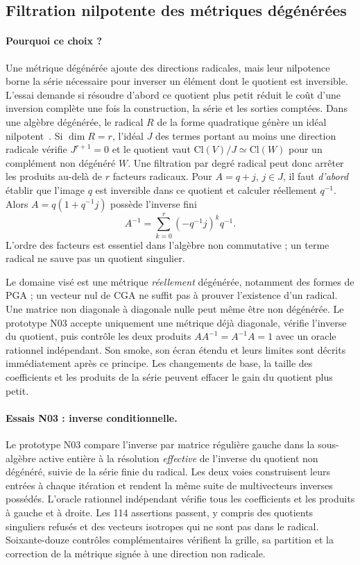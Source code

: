 \documentclass[11pt,a4paper]{article}
\newcommand{\Cl}{\mathrm{Cl}}
\begin{document}
\subsection{Filtration nilpotente des métriques dégénérées}
\paragraph{Pourquoi ce choix ?}
Une métrique dégénérée ajoute des directions radicales, mais leur
nilpotence borne la série nécessaire pour inverser un élément dont le
quotient est inversible. L'essai demande si résoudre d'abord ce
quotient plus petit réduit le coût d'une inversion complète une fois
la construction, la série et les sorties comptées.
Dans une algèbre dégénérée, le radical $R$ de la forme quadratique génère
un idéal nilpotent~\cite{ablamowicz,bamberg}. Si $\dim R=r$, l'idéal
$J$ des termes portant au moins une direction radicale vérifie
$J^{r+1}=0$ et le quotient vaut $\Cl(V)/J\simeq\Cl(W)$ pour un
complément non dégénéré $W$. Une filtration par degré radical peut
donc arrêter les produits au-delà de $r$ facteurs radicaux.
Pour $A=q+j$, $j\in J$, il faut \emph{d'abord} établir que l'image
$q$ est inversible dans ce quotient et calculer réellement $q^{-1}$.
Alors $A=q(1+q^{-1}j)$ possède l'inverse fini
\[
 A^{-1}=\sum_{k=0}^{r}(-q^{-1}j)^k q^{-1}.
\]
L'ordre des facteurs est essentiel dans l'algèbre non commutative ;
un terme radical ne sauve pas un quotient singulier.

Le domaine visé est une métrique \emph{réellement} dégénérée, notamment des
formes de PGA ; un vecteur nul de CGA ne suffit pas à prouver l'existence
d'un radical. Une matrice non diagonale à diagonale nulle peut même être
non dégénérée. Le prototype N03 accepte uniquement une métrique déjà
diagonale, vérifie l'inverse du quotient, puis contrôle les deux produits
$AA^{-1}=A^{-1}A=1$ avec un oracle rationnel
indépendant. Son smoke, son écran étendu et leurs limites
sont décrits immédiatement après ce principe. Les changements de base, la taille des
coefficients et les produits de la série peuvent effacer le gain du
quotient plus petit.

\paragraph{Essais N03 : inverse conditionnelle.}
\label{sec:n03perf}
Le prototype N03 compare l'inverse par matrice régulière gauche dans
la sous-algèbre active entière à la résolution \emph{effective} de
l'inverse du quotient non dégénéré, suivie de la série finie du
radical. Les deux voies construisent leurs entrées à chaque
itération et rendent la même suite de multivecteurs inverses possédés.
L'oracle rationnel indépendant vérifie tous les coefficients et les
produits à gauche et à droite. Les 114 assertions passent, y compris
des quotients singuliers refusés et des vecteurs isotropes qui ne sont
pas dans le radical. Soixante-douze contrôles complémentaires vérifient
la grille, sa partition et la correction de la métrique signée à une
direction non radicale.
\end{document}
